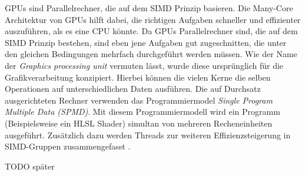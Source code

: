 GPUs sind Parallelrechner, die auf dem SIMD Prinzip basieren.
Die Many-Core Architektur von GPUs hilft dabei, die richtigen Aufgaben schneller und effizienter auszuführen, als es eine CPU könnte.
Da GPUs Parallelrechner sind, die auf dem SIMD Prinzip bestehen, sind eben jene Aufgaben gut zugeschnitten, die unter den gleichen Bedingungen mehrfach durchgeführt werden müssen.
Wie der Name der \textit{Graphics processing unit} vermuten lässt, wurde diese ursprünglich für die Grafikverarbeitung konzipiert.
Hierbei können die vielen Kerne die selben Operationen auf unterschiedlichen Daten ausführen.
Die auf Durchsatz ausgerichteten Rechner verwenden das Programmiermodel \textit{Single Program Multiple Data (SPMD)}.
Mit diesem Programmiermodell wird ein Programm (Beispielsweise ein HLSL Shader) simultan von mehreren Recheneinheiten ausgeführt.
Zusätzlich dazu werden Threads zur weiteren Effizienzsteigerung in SIMD-Gruppen zusammengefasst \cite{Yilmazer2014}.

TODO später \cite{Jakob2017} \newpage

